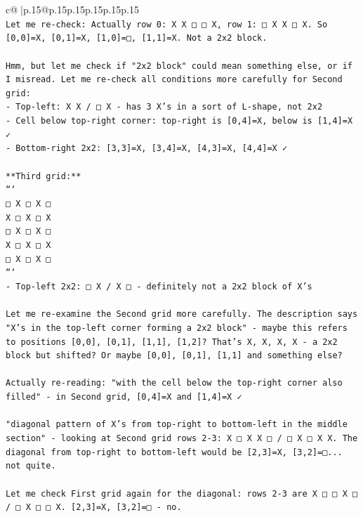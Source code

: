 \documentclass{article}
\begin{document}
{\begin{supertabular}{c@{$\;$}|p{.15\linewidth}@{}p{.15\linewidth}p{.15\linewidth}p{.15\linewidth}p{.15\linewidth}p{.15\linewidth}}
{{{\\ 
\texttt{Let me re{-}check: Actually row 0: X X □ □ X, row 1: □ X X □ X. So {[}0,0{]}=X, {[}0,1{]}=X, {[}1,0{]}=□, {[}1,1{]}=X. Not a 2x2 block.} \\
\\ 
\texttt{Hmm, but let me check if "2x2 block" could mean something else, or if I misread. Let me re{-}check all conditions more carefully for Second grid:} \\
\texttt{{-} Top{-}left: X X / □ X {-} has 3 X's in a sort of L{-}shape, not 2x2} \\
\texttt{{-} Cell below top{-}right corner: top{-}right is {[}0,4{]}=X, below is {[}1,4{]}=X ✓} \\
\texttt{{-} Bottom{-}right 2x2: {[}3,3{]}=X, {[}3,4{]}=X, {[}4,3{]}=X, {[}4,4{]}=X ✓} \\
\\ 
\texttt{**Third grid:**} \\
\texttt{```} \\
\texttt{□ X □ X □} \\
\texttt{X □ X □ X} \\
\texttt{□ X □ X □} \\
\texttt{X □ X □ X} \\
\texttt{□ X □ X □} \\
\texttt{```} \\
\texttt{{-} Top{-}left 2x2: □ X / X □ {-} definitely not a 2x2 block of X's} \\
\\ 
\texttt{Let me re{-}examine the Second grid more carefully. The description says "X's in the top{-}left corner forming a 2x2 block" {-} maybe this refers to positions {[}0,0{]}, {[}0,1{]}, {[}1,1{]}, {[}1,2{]}? That's X, X, X, X {-} a 2x2 block but shifted? Or maybe {[}0,0{]}, {[}0,1{]}, {[}1,1{]} and something else?} \\
\\ 
\texttt{Actually re{-}reading: "with the cell below the top{-}right corner also filled" {-} in Second grid, {[}0,4{]}=X and {[}1,4{]}=X ✓} \\
\\ 
\texttt{"diagonal pattern of X's from top{-}right to bottom{-}left in the middle section" {-} looking at Second grid rows 2{-}3: X □ X X □ / □ X □ X X. The diagonal from top{-}right to bottom{-}left would be {[}2,3{]}=X, {[}3,2{]}=□... not quite.} \\
\\ 
\texttt{Let me check First grid again for the diagonal: rows 2{-}3 are X □ □ X □ / □ X □ □ X. {[}2,3{]}=X, {[}3,2{]}=□ {-} no.} \\
}}}
\end{supertabular}}
\end{document}
